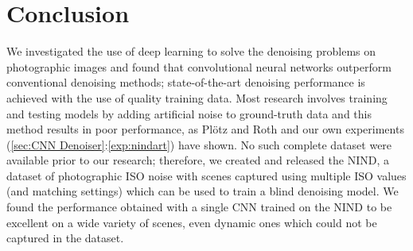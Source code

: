 \chapter{Conclusion}

We investigated the use of deep learning to solve the denoising problems on photographic images and found that convolutional neural networks outperform conventional denoising methods; state-of-the-art denoising performance is achieved with the use of quality training data. Most research involves training and testing models by adding artificial noise to ground-truth data and this method results in poor performance, as Plötz and Roth \cite{darmstadt} and our own experiments (\ref{sec:CNN Denoiser}:\ref{exp:nindart}) have shown. No such complete dataset were available prior to our research; therefore, we created and released the \acf{NIND}, a dataset of photographic ISO noise with scenes captured using multiple ISO values (and matching settings) which can be used to train a blind denoising model. We found the performance obtained with a single \acl{CNN} trained on the \ac{NIND} to be excellent on a wide variety of scenes, even dynamic ones which could not be captured in the dataset.

